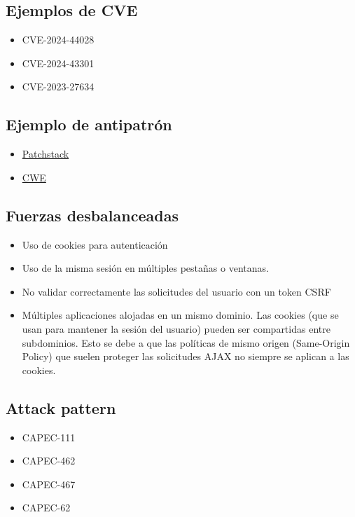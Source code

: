 \subsection{Ejemplos de CVE}
\begin{itemize}
    \item CVE-2024-44028
    \item CVE-2024-43301
    \item CVE-2023-27634
\end{itemize}

\subsection{Ejemplo de antipatrón} 

\begin{itemize}
    \item \href{https://patchstack.com/academy/wordpress/vulnerabilities/cross-site-request-forgery/}{Patchstack}
    \item \href{https://cwe.mitre.org/data/definitions/352.html}{CWE}
\end{itemize}

\subsection{Fuerzas desbalanceadas} \begin{itemize} \item Uso de cookies para autenticación \item Uso de la misma sesión en múltiples pestañas o ventanas. \item No validar correctamente las solicitudes del usuario con un token CSRF \item Múltiples aplicaciones alojadas en un mismo dominio. Las cookies (que se usan para mantener la sesión del usuario) pueden ser compartidas entre subdominios. Esto se debe a que las políticas de mismo origen (Same-Origin Policy) que suelen proteger las solicitudes AJAX no siempre se aplican a las cookies. \end{itemize}

\subsection{Attack pattern} 
\begin{itemize}
    \item CAPEC-111
    \item CAPEC-462
    \item CAPEC-467
    \item CAPEC-62
\end{itemize}

